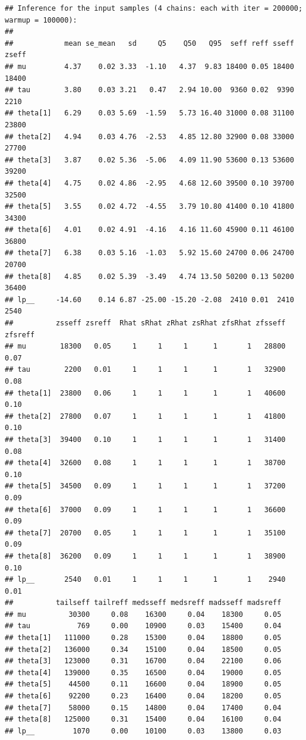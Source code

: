 \documentclass[american,]{article}
\begin{document}
\begin{verbatim}
## Inference for the input samples (4 chains: each with iter = 200000; warmup = 100000):
## 
##            mean se_mean   sd     Q5    Q50   Q95  seff reff sseff zseff
## mu         4.37    0.02 3.33  -1.10   4.37  9.83 18400 0.05 18400 18400
## tau        3.80    0.03 3.21   0.47   2.94 10.00  9360 0.02  9390  2210
## theta[1]   6.29    0.03 5.69  -1.59   5.73 16.40 31000 0.08 31100 23800
## theta[2]   4.94    0.03 4.76  -2.53   4.85 12.80 32900 0.08 33000 27700
## theta[3]   3.87    0.02 5.36  -5.06   4.09 11.90 53600 0.13 53600 39200
## theta[4]   4.75    0.02 4.86  -2.95   4.68 12.60 39500 0.10 39700 32500
## theta[5]   3.55    0.02 4.72  -4.55   3.79 10.80 41400 0.10 41800 34300
## theta[6]   4.01    0.02 4.91  -4.16   4.16 11.60 45900 0.11 46100 36800
## theta[7]   6.38    0.03 5.16  -1.03   5.92 15.60 24700 0.06 24700 20700
## theta[8]   4.85    0.02 5.39  -3.49   4.74 13.50 50200 0.13 50200 36400
## lp__     -14.60    0.14 6.87 -25.00 -15.20 -2.08  2410 0.01  2410  2540
##          zsseff zsreff  Rhat sRhat zRhat zsRhat zfsRhat zfsseff zfsreff
## mu        18300   0.05     1     1     1      1       1   28800    0.07
## tau        2200   0.01     1     1     1      1       1   32900    0.08
## theta[1]  23800   0.06     1     1     1      1       1   40600    0.10
## theta[2]  27800   0.07     1     1     1      1       1   41800    0.10
## theta[3]  39400   0.10     1     1     1      1       1   31400    0.08
## theta[4]  32600   0.08     1     1     1      1       1   38700    0.10
## theta[5]  34500   0.09     1     1     1      1       1   37200    0.09
## theta[6]  37000   0.09     1     1     1      1       1   36600    0.09
## theta[7]  20700   0.05     1     1     1      1       1   35100    0.09
## theta[8]  36200   0.09     1     1     1      1       1   38900    0.10
## lp__       2540   0.01     1     1     1      1       1    2940    0.01
##          tailseff tailreff medsseff medsreff madsseff madsreff
## mu          30300     0.08    16300     0.04    18300     0.05
## tau           769     0.00    10900     0.03    15400     0.04
## theta[1]   111000     0.28    15300     0.04    18800     0.05
## theta[2]   136000     0.34    15100     0.04    18500     0.05
## theta[3]   123000     0.31    16700     0.04    22100     0.06
## theta[4]   139000     0.35    16500     0.04    19000     0.05
## theta[5]    44500     0.11    16600     0.04    18900     0.05
## theta[6]    92200     0.23    16400     0.04    18200     0.05
## theta[7]    58000     0.15    14800     0.04    17400     0.04
## theta[8]   125000     0.31    15400     0.04    16100     0.04
## lp__         1070     0.00    10100     0.03    13800     0.03
\end{verbatim}
\end{document}
